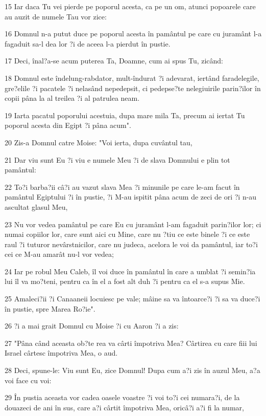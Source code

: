 \par 15 Iar daca Tu vei pierde pe poporul acesta, ca pe un om, atunci popoarele care au auzit de numele Tau vor zice:
\par 16 Domnul n-a putut duce pe poporul acesta în pamântul pe care cu juramânt l-a fagaduit sa-l dea lor ?i de aceea l-a pierdut în pustie.
\par 17 Deci, înal?a-se acum puterea Ta, Doamne, cum ai spus Tu, zicând:
\par 18 Domnul este îndelung-rabdator, mult-îndurat ?i adevarat, iertând faradelegile, gre?elile ?i pacatele ?i nelasând nepedepsit, ci pedepse?te nelegiuirile parin?ilor în copii pâna la al treilea ?i al patrulea neam.
\par 19 Iarta pacatul poporului acestuia, dupa mare mila Ta, precum ai iertat Tu poporul acesta din Egipt ?i pâna acum".
\par 20 Zis-a Domnul catre Moise: "Voi ierta, dupa cuvântul tau,
\par 21 Dar viu sunt Eu ?i viu e numele Meu ?i de slava Domnului e plin tot pamântul:
\par 22 To?i barba?ii câ?i au vazut slava Mea ?i minunile pe care le-am facut în pamântul Egiptului ?i în pustie, ?i M-au ispitit pâna acum de zeci de ori ?i n-au ascultat glasul Meu,
\par 23 Nu vor vedea pamântul pe care Eu cu juramânt l-am fagaduit parin?ilor lor; ci numai copiilor lor, care sunt aici cu Mine, care nu ?tiu ce este binele ?i ce este raul ?i tuturor nevârstnicilor, care nu judeca, acelora le voi da pamântul, iar to?i cei ce M-au amarât nu-l vor vedea;
\par 24 Iar pe robul Meu Caleb, îl voi duce în pamântul în care a umblat ?i semin?ia lui îl va mo?teni, pentru ca în el a fost alt duh ?i pentru ca el s-a supus Mie.
\par 25 Amaleci?ii ?i Canaaneii locuiesc pe vale; mâine sa va întoarce?i ?i sa va duce?i în pustie, spre Marea Ro?ie".
\par 26 ?i a mai grait Domnul cu Moise ?i cu Aaron ?i a zis:
\par 27 "Pâna când aceasta ob?te rea va cârti împotriva Mea? Cârtirea cu care fiii lui Israel cârtesc împotriva Mea, o aud.
\par 28 Deci, spune-le: Viu sunt Eu, zice Domnul! Dupa cum a?i zis în auzul Meu, a?a voi face cu voi:
\par 29 În pustia aceasta vor cadea oasele voastre ?i voi to?i cei numara?i, de la douazeci de ani în sus, care a?i cârtit împotriva Mea, oricâ?i a?i fi la numar,
